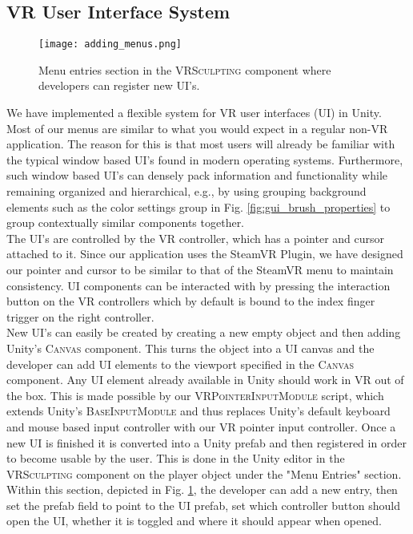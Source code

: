 \subsection{VR User Interface System}

\begin{figure}
\centering
\captionsetup{width=0.8\textwidth}
\texttt{[image: adding\_menus.png]}
\caption{Menu entries section in the \textsc{VRSculpting} component where developers can register new UI's.}
\label{fig:adding_menus}
\end{figure}

We have implemented a flexible system for VR user interfaces (UI) in Unity. Most of our menus are similar to what you would expect in a regular non-VR application. The reason for this is that most users will already be familiar with the typical window based UI's found in modern operating systems. Furthermore, such window based UI's can densely pack information and functionality while remaining organized and hierarchical, e.g., by using grouping background elements such as the color settings group in Fig. \ref{fig:gui_brush_properties} to group contextually similar components together.\\
The UI's are controlled by the VR controller, which has a pointer and cursor attached to it. Since our application uses the SteamVR Plugin, we have designed our pointer and cursor to be similar to that of the SteamVR menu to maintain consistency. UI components can be interacted with by pressing the interaction button on the VR controllers which by default is bound to the index finger trigger on the right controller.\\
New UI's can easily be created by creating a new empty object and then adding Unity's \textsc{Canvas} component. This turns the object into a UI canvas and the developer can add UI elements to the viewport specified in the \textsc{Canvas} component. Any UI element already available in Unity should work in VR out of the box. This is made possible by our \textsc{VRPointerInputModule} script, which extends Unity's \textsc{BaseInputModule} and thus replaces Unity's default keyboard and mouse based input controller with our VR pointer input controller. Once a new UI is finished it is converted into a Unity prefab and then registered in order to become usable by the user. This is done in the Unity editor in the \textsc{VRSculpting} component on the player object under the "Menu Entries" section. Within this section, depicted in Fig. \ref{fig:adding_menus}, the developer can add a new entry, then set the prefab field to point to the UI prefab, set which controller button should open the UI, whether it is toggled and where it should appear when opened.

